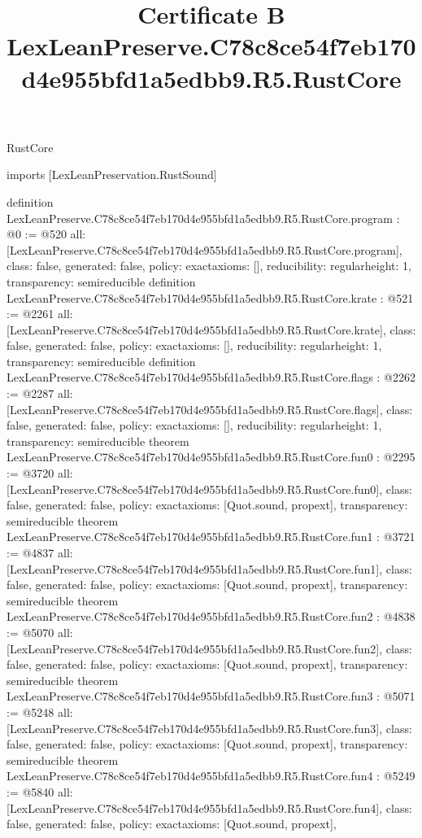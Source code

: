 \begin{lexlean}{RustCore}
\title{Certificate B LexLeanPreserve.C78c8ce54f7eb170d4e955bfd1a5edbb9.R5.RustCore}
\begin{coremodule}
imports [LexLeanPreservation.RustSound]

definition LexLeanPreserve.C78c8ce54f7eb170d4e955bfd1a5edbb9.R5.RustCore.program : @0 := @520 {
  all: [LexLeanPreserve.C78c8ce54f7eb170d4e955bfd1a5edbb9.R5.RustCore.program],
  class: false,
  generated: false,
  policy: exact{axioms: []},
  reducibility: regular{height: 1},
  transparency: semireducible
}
definition LexLeanPreserve.C78c8ce54f7eb170d4e955bfd1a5edbb9.R5.RustCore.krate : @521 := @2261 {
  all: [LexLeanPreserve.C78c8ce54f7eb170d4e955bfd1a5edbb9.R5.RustCore.krate],
  class: false,
  generated: false,
  policy: exact{axioms: []},
  reducibility: regular{height: 1},
  transparency: semireducible
}
definition LexLeanPreserve.C78c8ce54f7eb170d4e955bfd1a5edbb9.R5.RustCore.flags : @2262 := @2287 {
  all: [LexLeanPreserve.C78c8ce54f7eb170d4e955bfd1a5edbb9.R5.RustCore.flags],
  class: false,
  generated: false,
  policy: exact{axioms: []},
  reducibility: regular{height: 1},
  transparency: semireducible
}
theorem LexLeanPreserve.C78c8ce54f7eb170d4e955bfd1a5edbb9.R5.RustCore.fun0 : @2295 := @3720 {
  all: [LexLeanPreserve.C78c8ce54f7eb170d4e955bfd1a5edbb9.R5.RustCore.fun0],
  class: false,
  generated: false,
  policy: exact{axioms: [Quot.sound, propext]},
  transparency: semireducible
}
theorem LexLeanPreserve.C78c8ce54f7eb170d4e955bfd1a5edbb9.R5.RustCore.fun1 : @3721 := @4837 {
  all: [LexLeanPreserve.C78c8ce54f7eb170d4e955bfd1a5edbb9.R5.RustCore.fun1],
  class: false,
  generated: false,
  policy: exact{axioms: [Quot.sound, propext]},
  transparency: semireducible
}
theorem LexLeanPreserve.C78c8ce54f7eb170d4e955bfd1a5edbb9.R5.RustCore.fun2 : @4838 := @5070 {
  all: [LexLeanPreserve.C78c8ce54f7eb170d4e955bfd1a5edbb9.R5.RustCore.fun2],
  class: false,
  generated: false,
  policy: exact{axioms: [Quot.sound, propext]},
  transparency: semireducible
}
theorem LexLeanPreserve.C78c8ce54f7eb170d4e955bfd1a5edbb9.R5.RustCore.fun3 : @5071 := @5248 {
  all: [LexLeanPreserve.C78c8ce54f7eb170d4e955bfd1a5edbb9.R5.RustCore.fun3],
  class: false,
  generated: false,
  policy: exact{axioms: [Quot.sound, propext]},
  transparency: semireducible
}
theorem LexLeanPreserve.C78c8ce54f7eb170d4e955bfd1a5edbb9.R5.RustCore.fun4 : @5249 := @5840 {
  all: [LexLeanPreserve.C78c8ce54f7eb170d4e955bfd1a5edbb9.R5.RustCore.fun4],
  class: false,
  generated: false,
  policy: exact{axioms: [Quot.sound, propext]},
}
\end{coremodule}
\end{lexlean}
